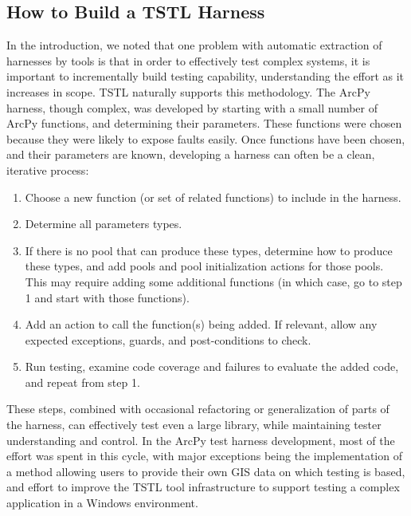 \subsection{How to Build a TSTL Harness}

In the introduction, we noted that one problem with automatic
extraction of harnesses by tools is that in order to effectively test
complex systems, it is important to incrementally build testing
capability, understanding the effort as it increases in scope.  TSTL
naturally supports this methodology.  The ArcPy harness, though
complex, was developed by starting with a small number of ArcPy
functions, and determining their parameters.  These functions were
chosen because they were likely to expose faults easily.  Once
functions have been chosen, and their parameters are known,
developing a harness can often be a clean, iterative process:

\begin{enumerate}
\item Choose a new function (or set of related functions) to include
  in the harness.
\item Determine all parameters types.
\item If there is no pool that can produce these types, determine how
  to produce these types, and add pools and pool initialization actions for
  those pools.  This may require adding some additional
  functions (in which case, go to step 1 and start with those
  functions).
\item Add an action to call the function(s) being added.  If relevant,
  allow any expected exceptions, guards, and post-conditions to check.
\item Run testing, examine code coverage and failures to evaluate the
  added code, and repeat from step 1.
\end{enumerate}

These steps, combined with occasional refactoring or generalization of
parts of the harness, can effectively test even a large library, while
maintaining tester understanding and control.   In the ArcPy test
harness development, most of the effort was spent in this cycle, with
major exceptions being the implementation of a method allowing users
to provide their own GIS data on which testing is based, and effort to
improve the TSTL tool infrastructure to support testing a complex
application in a Windows environment.